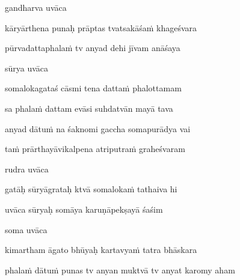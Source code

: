 gandharva uvāca~{\dandab}\dontdisplaylinenum 
{}

kāryārthena punaḥ prāptas tvatsakāśaṁ khageśvara\thinspace{\danda} \dontdisplaylinenum

pūrvadattaphalaṁ tv anyad dehi jīvam anāśaya \veg\dontdisplaylinenum
{}

sūrya uvāca~{\dandab}\dontdisplaylinenum 

somalokagataś cāsmi tena dattaṁ phalottamam\thinspace{\danda} \dontdisplaylinenum

sa phalaṁ dattam evāsi suhdatvān mayā tava \veg\dontdisplaylinenum
{}

anyad dātuṁ na śaknomi gaccha somapurādya vai\thinspace{\dandab} \dontdisplaylinenum

taṁ prārthayāvikalpena atriputraṁ graheśvaram \veg\dontdisplaylinenum
{}

rudra uvāca~{\dandab}\dontdisplaylinenum 
{}

gatāḥ sūryāgrataḥ ktvā somalokaṁ tathaiva hi\thinspace{\danda} \dontdisplaylinenum

uvāca sūryaḥ somāya karuṇāpekṣayā śaśim \veg\dontdisplaylinenum
{}

soma uvāca~{\dandab}\dontdisplaylinenum 

kimartham āgato bhūyaḥ kartavyaṁ tatra bhāskara\thinspace{\danda} \dontdisplaylinenum

phalaṁ dātuṁ punas tv anyan muktvā tv anyat karomy aham \veg\dontdisplaylinenum
{}

